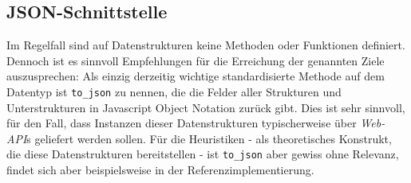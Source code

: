 \subsection{JSON-Schnittstelle}
Im Regelfall sind auf Datenstrukturen keine Methoden oder Funktionen definiert. Dennoch ist es sinnvoll Empfehlungen für die Erreichung der genannten Ziele auszusprechen: Als einzig derzeitig wichtige standardisierte Methode auf dem Datentyp ist \texttt{to\_json} zu nennen, die die Felder aller Strukturen und Unterstrukturen in Javascript Object Notation\cite{jsonspec} zurück gibt. Dies ist sehr sinnvoll, für den Fall, dass Instanzen dieser Datenstrukturen typischerweise über \textit{Web-API}s geliefert werden sollen. Für die Heuristiken - als theoretisches Konstrukt, die diese Datenstrukturen bereitstellen - ist \texttt{to\_json} aber gewiss ohne Relevanz, findet sich aber beispielsweise in der Referenzimplementierung.
